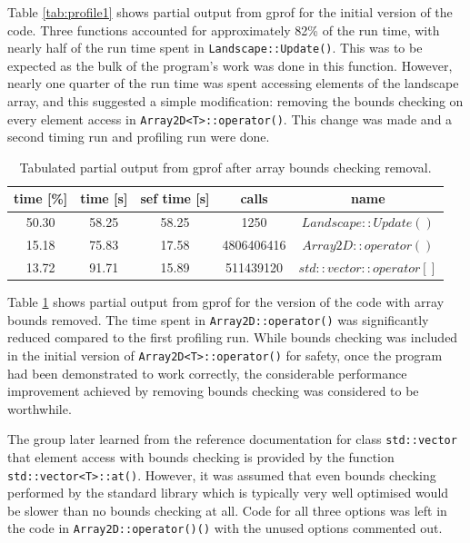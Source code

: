 Table \ref{tab:profile1} shows partial output from gprof for the initial version of the code.
Three functions accounted for approximately 82\% of the run time, with nearly half of the run time spent in \texttt{Landscape::Update()}.
This was to be expected as the bulk of the program's work was done in this function.
However, nearly one quarter of the run time was spent accessing elements of the landscape array, and this suggested a simple modification: removing the bounds checking on every element access in \texttt{Array2D<T>::operator()}.
This change was made and a second timing run and profiling run were done.

\begin{table}[h!]
\caption{Tabulated partial output from gprof after array bounds checking removal.}
\label{tab:profile2}
\begin{center}
\begin{tabular}{|c|c|c|c|c|}
\hline
time [\%] & time [s] & sef time [s] & calls & name\\
\hline
50.30 & 58.25 & 58.25 & 1250 & $Landscape::Update()$\\
\hline
15.18 & 75.83 & 17.58 & 4806406416 & $Array2D::operator()$\\
\hline
13.72 & 91.71 & 15.89 & 511439120 & $std::vector::operator[]$\\
\hline
\end{tabular}
\end{center}
\end{table}

Table \ref{tab:profile2} shows partial output from gprof for the version of the code with array bounds removed.
The time spent in \texttt{Array2D::operator()} was significantly reduced compared to the first profiling run.
While bounds checking was included in the initial version of \texttt{Array2D<T>::operator()} for safety, once the program had been demonstrated to work correctly, the considerable performance improvement achieved by removing bounds checking was considered to be worthwhile.

The group later learned from the reference documentation for class \texttt{std::vector} that element access with bounds checking is provided by the function \texttt{std::vector<T>::at()}.
However, it was assumed that even bounds checking performed by the standard library which is typically very well optimised would be slower than no bounds checking at all.
Code for all three options was left in the code in \texttt{Array2D::operator()()} with the unused options commented out.

